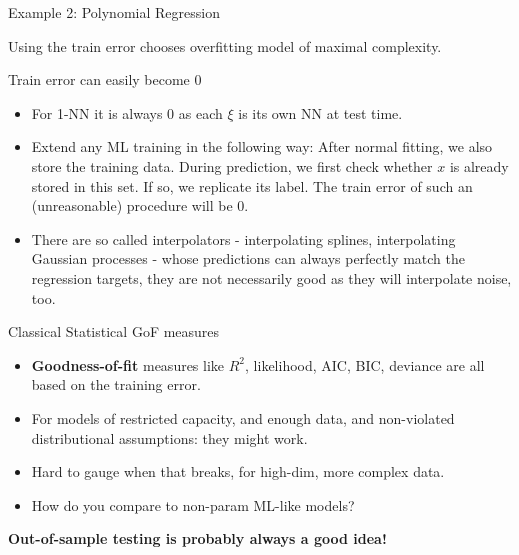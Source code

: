 \documentclass[11pt,compress,t,notes=noshow, xcolor=table]{beamer}
\begin{document}
\begin{vbframe}{Example 2: Polynomial Regression}
\vfill

Using the train error chooses overfitting model of maximal complexity.

\end{vbframe}



\begin{vbframe}{Train error can easily become 0}


\begin{itemize}
    \item For 1-NN it is always 0 as each $\xi$ is its own NN at test time.
  \item Extend any ML training in the following way:
    After normal fitting, we also store the training data.
    During prediction, we first check whether $x$ is already stored in this set. 
    If so, we replicate its label.
    The train error of such an (unreasonable) procedure will be 0.
  \item There are so called interpolators - interpolating 
  splines, interpolating Gaussian processes - whose predictions can always 
  perfectly match the regression targets, they are not necessarily good as they 
  will interpolate noise, too.
\end{itemize}
\end{vbframe}


\begin{vbframe}{Classical Statistical GoF measures}

\begin{itemize}
  \item \textbf{Goodness-of-fit} measures like $R^2$, likelihood, AIC, 
  BIC, deviance are all based on the training error.
  \item For models of restricted capacity, and enough data, 
      and non-violated distributional assumptions: 
      they might work.
  \item Hard to gauge when that breaks, for high-dim, more complex data.
  \item How do you compare to non-param ML-like models?
\end{itemize}

\vfill

\textbf{Out-of-sample testing is probably always a good idea!}

\end{vbframe}




\endlecture
\end{document}
